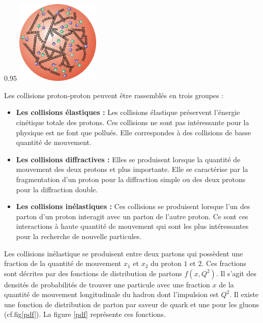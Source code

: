 \begin{minipagewithmarginpars}[h]{0.95\textwidth}
\centering
\includegraphics[width=0.3\textwidth]{SM/quarks3.png}
\label{proton}	
\end{minipagewithmarginpars}

Les collisions proton-proton peuvent être rassemblés en trois groupes :
\begin{itemize}
	\item \textbf{Les collisions élastiques : } Les collisions élastique préservent l'énergie cinétique totale des protons. Ces collisions ne sont pas intéressante pour la physique est ne font que pollués. Elle correspondes à des collisions de basse quantité de mouvement.
	\item\textbf{Les collisions diffractives : } Elles se produisent lorsque la quantité de mouvement des deux protons et plus importante. Elle se caractérise par la fragmentation d'un proton pour la diffraction simple ou des deux protons pour la diffraction double.
	\item \textbf{Les collisions inélastiques : } Ces collisions se produisent lorsque l'un des parton d'un proton interagit avec un parton de l'autre proton. Ce sont ces interactions à haute quantité de mouvement qui sont les plus intéressantes pour la recherche de nouvelle particules.
\end{itemize}

Les collisions inélastique se produisent entre deux partons qui possèdent une fraction de la quantité de mouvement $x_{1}$ et $x_{2}$ du proton $1$ et $2$. Ces fractions sont décrites par des fonctions de distribution de partons $f(x,Q^{2})$. Il s'agit des densités de probabilités de trouver une particule avec une fraction $x$ de la quantité de mouvement longitudinale du hadron dont l'impulsion est $Q^{2}$. Il existe une fonction de distribution de parton par saveur de quark et une pour les gluons (cf.fig\ref{pdf}). La figure \ref{pdf} représente ces fonctions.

